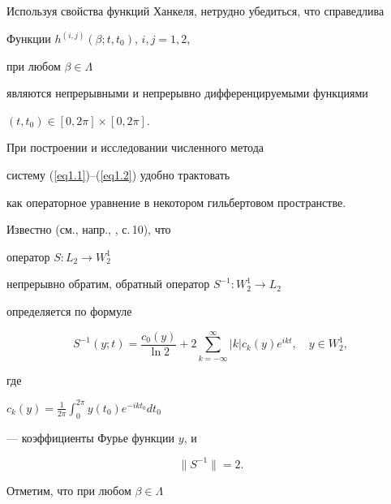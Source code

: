 Используя свойства функций Ханкеля, нетрудно убедиться, что справедлива 





\begin{lem}


\label{ker-H}


Функции $h^{(i,j)}(\beta;t,t_0)$, $i,j=1,2$, 


при любом $\beta \in \Lambda$


являются непрерывными и непрерывно дифференцируемыми функциями


$(t,t_0)\in [0, 2\pi]\times [0, 2\pi]$. 


\end{lem}





При построении и исследовании численного метода


систему (\ref{eq1.1})--(\ref{eq1.2}) удобно трактовать 


как операторное уравнение в некотором гильбертовом пространстве.


Известно (см., напр., \cite{209611220016}, с.\,10), что


оператор $S: L_2 \to W_2^1$ 


непрерывно обратим, обратный оператор $S^{-1}: W_2^1 \to L_2$ 


определяется по формуле 


\begin{equation}


\label{s-1}


S^{-1}(y;t)=\frac{c_0(y)}{\ln 2}+


2\sum_{k=-\infty}^{\infty}|k|c_k(y)e^{ikt},


\quad y \in W_2^1,


\end{equation}


где 


$\displaystyle c_k(y)=\frac{1}{2\pi}\int_0^{2\pi}y(t_0)e^{-ikt_0}dt_0$


--- коэффициенты Фурье функции $y$, и


\begin{equation}


\label{norms-1}


\|S^{-1}\|=2.


\end{equation}


Отметим, что при любом $\beta \in \Lambda$ 


